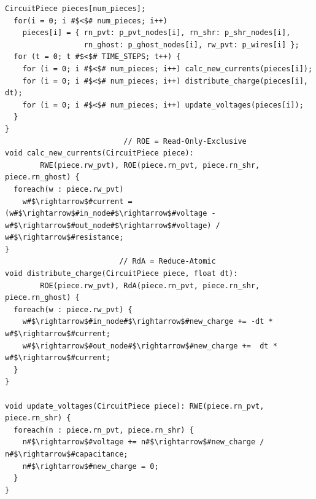 \begin{lstlisting}[float,floatplacement=H,label={lst:code_ex},caption={Circuit simulation}]
  CircuitPiece pieces[num_pieces];
  for(i = 0; i #$<$# num_pieces; i++) 
    pieces[i] = { rn_pvt: p_pvt_nodes[i], rn_shr: p_shr_nodes[i],
                  rn_ghost: p_ghost_nodes[i], rw_pvt: p_wires[i] };
  for (t = 0; t #$<$# TIME_STEPS; t++) {
    for (i = 0; i #$<$# num_pieces; i++) calc_new_currents(pieces[i]);
    for (i = 0; i #$<$# num_pieces; i++) distribute_charge(pieces[i], dt);
    for (i = 0; i #$<$# num_pieces; i++) update_voltages(pieces[i]);
  }
}
                           // ROE = Read-Only-Exclusive
void calc_new_currents(CircuitPiece piece):
        RWE(piece.rw_pvt), ROE(piece.rn_pvt, piece.rn_shr, piece.rn_ghost) {
  foreach(w : piece.rw_pvt)
    w#$\rightarrow$#current = (w#$\rightarrow$#in_node#$\rightarrow$#voltage - w#$\rightarrow$#out_node#$\rightarrow$#voltage) / w#$\rightarrow$#resistance;
}
                          // RdA = Reduce-Atomic
void distribute_charge(CircuitPiece piece, float dt):
        ROE(piece.rw_pvt), RdA(piece.rn_pvt, piece.rn_shr, piece.rn_ghost) {
  foreach(w : piece.rw_pvt) {
    w#$\rightarrow$#in_node#$\rightarrow$#new_charge += -dt * w#$\rightarrow$#current;
    w#$\rightarrow$#out_node#$\rightarrow$#new_charge +=  dt * w#$\rightarrow$#current;
  }
}

void update_voltages(CircuitPiece piece): RWE(piece.rn_pvt, piece.rn_shr) {
  foreach(n : piece.rn_pvt, piece.rn_shr) {
    n#$\rightarrow$#voltage += n#$\rightarrow$#new_charge / n#$\rightarrow$#capacitance;
    n#$\rightarrow$#new_charge = 0;
  }
}
\end{lstlisting}

